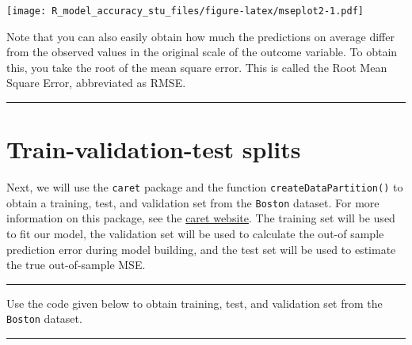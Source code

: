\documentclass[
  12pt,
]{article}
\begin{document}
\texttt{[image: R\_model\_accuracy\_stu\_files/figure-latex/mseplot2-1.pdf]}

Note that you can also easily obtain how much the predictions on average
differ from the observed values in the original scale of the outcome
variable. To obtain this, you take the root of the mean square error.
This is called the Root Mean Square Error, abbreviated as RMSE.

\begin{center}\rule{0.5\linewidth}{0.5pt}\end{center}

\hypertarget{train-validation-test-splits}{%
\section{Train-validation-test
splits}\label{train-validation-test-splits}}

Next, we will use the \texttt{caret} package and the function
\texttt{createDataPartition()} to obtain a training, test, and
validation set from the \texttt{Boston} dataset. For more information on
this package, see the
\href{https://topepo.github.io/caret/index.html}{caret website}. The
training set will be used to fit our model, the validation set will be
used to calculate the out-of sample prediction error during model
building, and the test set will be used to estimate the true
out-of-sample MSE.

\begin{center}\rule{0.5\linewidth}{0.5pt}\end{center}

Use the code given below to obtain training, test, and validation set
from the \texttt{Boston} dataset.

\begin{center}\rule{0.5\linewidth}{0.5pt}\end{center}
\end{document}

